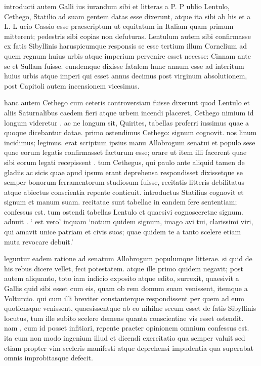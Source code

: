  introducti autem Galli ius iurandum sibi et litteras a P. P ublio Lentulo, Cethego, Statilio ad suam gentem datas esse dixerunt, atque ita sibi ab his et a L. L ucio Cassio esse praescriptum ut equitatum in Italiam quam primum mitterent; pedestris sibi copias non defuturas. Lentulum autem sibi confirmasse ex fatis Sibyllinis haruspicumque responsis se esse tertium illum Cornelium ad quem regnum huius urbis atque imperium pervenire esset necesse: Cinnam ante se et Sullam fuisse. eundemque dixisse fatalem hunc annum esse ad interitum huius urbis atque imperi qui esset annus decimus post virginum absolutionem, post Capitoli autem incensionem vicesimus.

 hanc autem Cethego cum ceteris controversiam fuisse dixerunt quod Lentulo et aliis Saturnalibus caedem fieri atque urbem incendi placeret, Cethego nimium id longum videretur . ac ne longum sit, Quirites, tabellas proferri iussimus quae a quoque dicebantur datae. primo ostendimus Cethego: signum cognovit. nos linum incidimus; legimus. erat scriptum ipsius manu Allobrogum senatui et populo sese quae eorum legatis confirmasset facturum esse; orare ut item illi facerent quae sibi eorum legati recepissent . tum Cethegus, qui paulo ante aliquid tamen de gladiis ac sicis quae apud ipsum erant deprehensa respondisset dixissetque se semper bonorum ferramentorum studiosum fuisse, recitatis litteris debilitatus atque abiectus conscientia repente conticuit. introductus Statilius cognovit et signum et manum suam. recitatae sunt tabellae in eandem fere sententiam; confessus est. tum ostendi tabellas Lentulo et quaesivi cognosceretne signum. adnuit . ` est vero' inquam `notum quidem signum, imago avi tui, clarissimi viri, qui amavit unice patriam et civis suos; quae quidem te a tanto scelere etiam muta revocare debuit.'

 leguntur eadem ratione ad senatum Allobrogum populumque litterae. si quid de his rebus dicere vellet, feci potestatem. atque ille primo quidem negavit; post autem aliquanto, toto iam indicio exposito atque edito, surrexit, quaesivit a Gallis quid sibi esset cum eis, quam ob rem domum suam venissent, itemque a Volturcio. qui cum illi breviter constanterque respondissent per quem ad eum quotiensque venissent, quaesissentque ab eo nihilne secum esset de fatis Sibyllinis locutus, tum ille subito scelere demens quanta conscientiae vis esset ostendit. nam , cum id posset infitiari, repente praeter opinionem omnium confessus est. ita eum non modo ingenium illud et dicendi exercitatio qua semper valuit sed etiam propter vim sceleris manifesti atque deprehensi impudentia qua superabat omnis improbitasque defecit.

